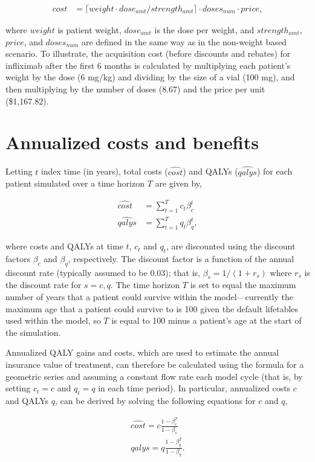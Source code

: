 \documentclass[11pt,final,fleqn]{article}
\theoremstyle{plain}
\begin{document}
\begin{appendices}
\begin{align}
cost &= \lceil weight \cdot dose_{amt}/strength_{amt}\rceil \cdot doses_{num} \cdot price,
\end{align}

where $weight$ is patient weight, $dose_{amt}$ is the dose per weight, and $strength_{amt}$, $price$, and $doses_{num}$ are defined in the same way as in the non-weight based scenario. To illustrate, the acquisition cost (before discounts and rebates) for infliximab after the first 6 months is calculated by multiplying each patient's weight by the dose (6 mg/kg) and dividing by the size of a vial (100 mg), and then multiplying by the number of doses (8.67) and the price per unit (\$1,167.82). 

\section{Annualized costs and benefits}\label{app:insurance-value}
Letting $t$ index time (in years), total costs ($\hat{cost}$) and QALYs ($\hat{qalys}$) for each patient simulated over a time horizon $T$ are given by,

\begin{align}
\hat{cost} &= \sum_{t=1}^T c_t \beta_c^t\\
\hat{qalys} &= \sum_{t=1}^T q_t \beta_q^t,
\end{align}

where costs and QALYs at time $t$, $c_t$ and $q_t$, are discounted using the discount factors $\beta_c$ and $\beta_q$, respectively. The discount factor is a function of the annual discount rate (typically assumed to be 0.03); that is, $\beta_s = 1/(1+r_s)$ where $r_s$ is the discount rate for $s=c,q$. The time horizon $T$ is set to equal the maximum number of years that a patient could survive within the model---currently the maximum age that a patient could survive to is 100 given the default lifetables used within the model, so $T$ is equal to 100 minus a patient's age at the start of the simulation. 

Annualized QALY gains and costs, which are used to estimate the annual insurance value of treatment, can therefore be calculated using the formula for a geometric series and assuming a constant flow rate each model cycle (that is, by setting $c_t = c$ and $q_t = q$ in each time period). In particular, annualized costs $c$ and QALYs $q$, can be derived by solving the following equations for $c$ and $q$,  

\begin{align}
\hat{cost} = c \frac{1-\beta_c^T}{1- \beta_c}\\
\hat{qalys} = q \frac{1-\beta_q^T}{1- \beta_q}.
\end{align}


\end{appendices}
\end{document}

